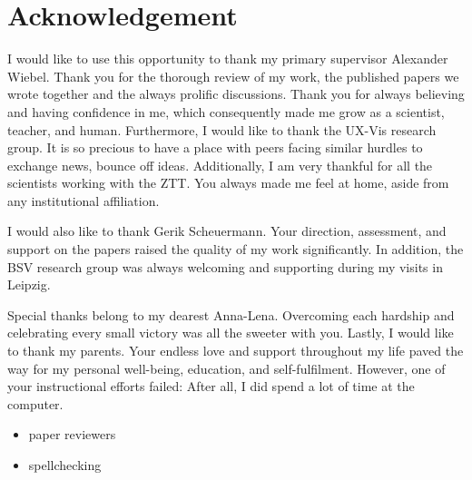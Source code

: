 %
\chapter*{Acknowledgement}
\label{sec:acknowledgement}
\vspace*{-10mm}

I would like to use this opportunity to thank my primary supervisor Alexander Wiebel. Thank you for the thorough review of my work, the published papers we wrote together and the always prolific discussions. Thank you for always believing and having confidence in me, which consequently made me grow as a scientist, teacher, and human. Furthermore, I would like to thank the UX-Vis research group. It is so precious to have a place with peers facing similar hurdles to exchange news, bounce off ideas. Additionally, I am very thankful for all the scientists working with the ZTT. You always made me feel at home, aside from any institutional affiliation.

I would also like to thank Gerik Scheuermann. Your direction, assessment, and support on the papers raised the quality of my work significantly. In addition, the BSV research group was always welcoming and supporting during my visits in Leipzig.

Special thanks belong to my dearest Anna-Lena. Overcoming each hardship and celebrating every small victory was all the sweeter with you. Lastly, I would like to thank my parents. Your endless love and support throughout my life paved the way for my personal well-being, education, and self-fulfilment. However, one of your instructional efforts failed: After all, I did spend a lot of time at the computer.

\begin{itemize}
    \item paper reviewers
    \item spellchecking
\end{itemize}
